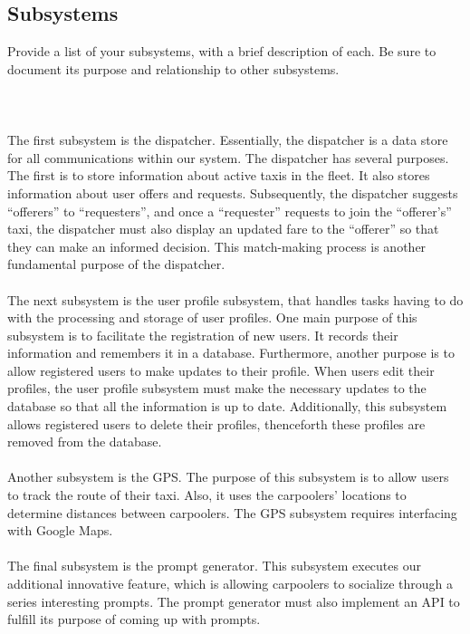 \documentclass[]{article}
\begin{document}
\subsection{Subsystems}
\label{sub:subsystems}
 Provide a list of your subsystems, with a brief description of each. Be sure to document its purpose and relationship to other subsystems.
\\\\\\\\
The first subsystem is the dispatcher. Essentially, the dispatcher is a data store for all communications within our system. The dispatcher has several purposes. The first is to store information about active taxis in the fleet. It also stores information about user offers and requests. Subsequently, the dispatcher suggests “offerers” to “requesters”, and once a “requester” requests to join the “offerer’s” taxi, the dispatcher must also display an updated fare to the “offerer” so that they can make an informed decision. This match-making process is another fundamental purpose of the dispatcher.
\\\\
The next subsystem is the user profile subsystem, that handles tasks having to do with the processing and storage of user profiles. One main purpose of this subsystem is to facilitate the registration of new users. It records their information and remembers it in a database. Furthermore, another purpose is to allow registered users to make updates to their profile. When users edit their profiles, the user profile subsystem must make the necessary updates to the database so that all the information is up to date. Additionally, this subsystem allows registered users to delete their profiles, thenceforth these profiles are removed from the database.
\\\\
Another subsystem is the GPS. The purpose of this subsystem is to allow users to track the route of their taxi. Also, it uses the carpoolers’ locations to determine distances between carpoolers. The GPS subsystem requires interfacing with Google Maps.
\\\\
The final subsystem is the prompt generator. This subsystem executes our additional innovative feature, which is allowing carpoolers to socialize through a series interesting prompts. The prompt generator must also implement an API to fulfill its purpose of coming up with prompts.
\\\\
\end{document}
